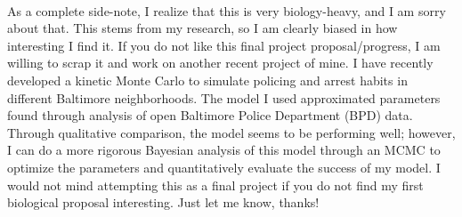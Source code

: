 \documentclass[10pt]{article}
\begin{document}
\\
As a complete side-note, I realize that this is very biology-heavy, and I am sorry about that. This stems from my research, so I am clearly biased in how interesting I find it. If you do not like this final project proposal/progress, I am willing to scrap it and work on another recent project of mine. I have recently developed a kinetic Monte Carlo to simulate policing and arrest habits in different Baltimore neighborhoods. The model I used approximated parameters found through analysis of open Baltimore Police Department (BPD) data. Through qualitative comparison, the model seems to be performing well; however, I can do a more rigorous Bayesian analysis of this model through an MCMC to optimize the parameters and quantitatively evaluate the success of my model. I would not mind attempting this as a final project if you do not find my first biological proposal interesting. Just let me know, thanks!

 
 
\end{document}

